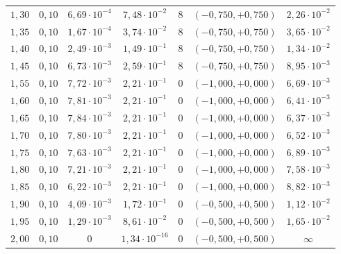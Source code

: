 \begin{tabular}{ccccccc}
$1{,}30$ & $0{,}10$ & $6{,}69 \cdot 10^{-4}$ & $7{,}48 \cdot 10^{-2}$ & 8 & $(-0{,}750, +0{,}750)$ & $2{,}26 \cdot 10^{-2}$ \\
$1{,}35$ & $0{,}10$ & $1{,}67 \cdot 10^{-4}$ & $3{,}74 \cdot 10^{-2}$ & 8 & $(-0{,}750, +0{,}750)$ & $3{,}65 \cdot 10^{-2}$ \\
$1{,}40$ & $0{,}10$ & $2{,}49 \cdot 10^{-3}$ & $1{,}49 \cdot 10^{-1}$ & 8 & $(-0{,}750, +0{,}750)$ & $1{,}34 \cdot 10^{-2}$ \\
$1{,}45$ & $0{,}10$ & $6{,}73 \cdot 10^{-3}$ & $2{,}59 \cdot 10^{-1}$ & 8 & $(-0{,}750, +0{,}750)$ & $8{,}95 \cdot 10^{-3}$ \\
$1{,}55$ & $0{,}10$ & $7{,}72 \cdot 10^{-3}$ & $2{,}21 \cdot 10^{-1}$ & 0 & $(-1{,}000, +0{,}000)$ & $6{,}69 \cdot 10^{-3}$ \\
$1{,}60$ & $0{,}10$ & $7{,}81 \cdot 10^{-3}$ & $2{,}21 \cdot 10^{-1}$ & 0 & $(-1{,}000, +0{,}000)$ & $6{,}41 \cdot 10^{-3}$ \\
$1{,}65$ & $0{,}10$ & $7{,}84 \cdot 10^{-3}$ & $2{,}21 \cdot 10^{-1}$ & 0 & $(-1{,}000, +0{,}000)$ & $6{,}37 \cdot 10^{-3}$ \\
$1{,}70$ & $0{,}10$ & $7{,}80 \cdot 10^{-3}$ & $2{,}21 \cdot 10^{-1}$ & 0 & $(-1{,}000, +0{,}000)$ & $6{,}52 \cdot 10^{-3}$ \\
$1{,}75$ & $0{,}10$ & $7{,}63 \cdot 10^{-3}$ & $2{,}21 \cdot 10^{-1}$ & 0 & $(-1{,}000, +0{,}000)$ & $6{,}89 \cdot 10^{-3}$ \\
$1{,}80$ & $0{,}10$ & $7{,}21 \cdot 10^{-3}$ & $2{,}21 \cdot 10^{-1}$ & 0 & $(-1{,}000, +0{,}000)$ & $7{,}58 \cdot 10^{-3}$ \\
$1{,}85$ & $0{,}10$ & $6{,}22 \cdot 10^{-3}$ & $2{,}21 \cdot 10^{-1}$ & 0 & $(-1{,}000, +0{,}000)$ & $8{,}82 \cdot 10^{-3}$ \\
$1{,}90$ & $0{,}10$ & $4{,}09 \cdot 10^{-3}$ & $1{,}72 \cdot 10^{-1}$ & 0 & $(-0{,}500, +0{,}500)$ & $1{,}12 \cdot 10^{-2}$ \\
$1{,}95$ & $0{,}10$ & $1{,}29 \cdot 10^{-3}$ & $8{,}61 \cdot 10^{-2}$ & 0 & $(-0{,}500, +0{,}500)$ & $1{,}65 \cdot 10^{-2}$ \\
$2{,}00$ & $0{,}10$ & $0$ & $1{,}34 \cdot 10^{-16}$ & 0 & $(-0{,}500, +0{,}500)$ & $\infty$ \\
\bottomrule
\end{tabular}

